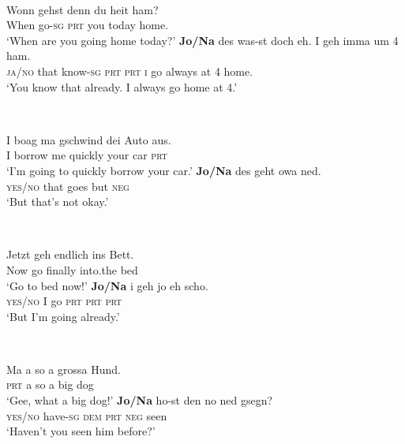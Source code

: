\documentclass[output=paper]{LSP/langsci}
\begin{document}
\ea\label{ex:wiltschko:70}
\\
\begin{xlist}
 \gll Wonn gehst    denn du    heit    ham? \\
      When go-\textsc{sg} \textsc{prt} you  today home.\\
      \glt ‘When are you going home today?’
   \gll \textbf{{Jo/Na}} des   was-st    doch   eh.   I geh imma    um 4 ham.\\
    \textsc{ja/no} that  know-\textsc{sg}   \textsc{prt}  \textsc{prt}  \textsc{i} go    always at  4 home.\\
    \glt ‘You know that already. I always go home at 4.’
\end{xlist}
\z


\ea\label{ex:wiltschko:71}
\\
\begin{xlist}
\gll I boag     ma gschwind dei    Auto aus. \\
      I {borrow} me  quickly    your car   \textsc{prt}\\
     \glt ‘I’m going to quickly {borrow} your car.’
\gll  \textbf{{Jo/Na}}     des  geht  owa  ned.\\
      \textsc{yes/no}   that goes but    \textsc{neg} \\
      \glt ‘But that’s not okay.’
\end{xlist}
\z

\ea\label{ex:wiltschko:72}
\\
\begin{xlist} 
\gll Jetzt geh endlich ins         Bett. \\
Now go   finally  into.the bed\\
\glt ‘Go to bed now!’
\gll \textbf{Jo/Na}  i  geh  jo   eh   scho.\\
      \textsc{yes/no} I go   \textsc{prt} \textsc{prt}  \textsc{prt}\\
 \glt ‘But I’m going already.’
\end{xlist}
\z

\ea\label{ex:wiltschko:73}
\\
\begin{xlist}
\gll Ma a so a grossa Hund. \\
\textsc{prt} a so a big      dog\\
\glt ‘Gee, what a big dog!’
\gll \textbf{{Jo/Na}} ho-st         den no   ned  gsegn?\\
      \textsc{yes/no} have-\textsc{sg} \textsc{dem} \textsc{prt} \textsc{neg} seen\\
      \glt ‘Haven’t you seen him before?’
\end{xlist}
\z
\end{document}
